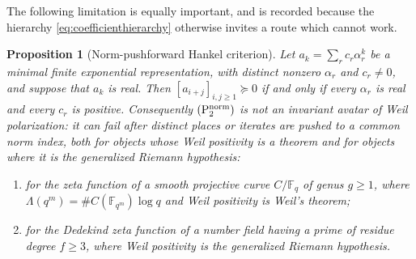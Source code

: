 \documentclass[11pt]{amsart}
\newtheorem{proposition}[theorem]{Proposition}
\theoremstyle{definition}
\theoremstyle{remark}
\begin{document}
The following limitation is equally important, and is recorded because the
hierarchy \eqref{eq:coefficienthierarchy} otherwise invites a route which
cannot work.

\begin{proposition}[Norm-pushforward Hankel criterion]
\label{prop:P2nogo}
Let $a_k=\sum_rc_r\alpha_r^k$ be a minimal finite exponential
representation, with distinct nonzero $\alpha_r$ and $c_r\ne0$, and suppose
that $a_k$ is real.  Then $[a_{i+j}]_{i,j\ge1}\succeq0$ if and only if every
$\alpha_r$ is real and every $c_r$ is positive.  Consequently
$\mathrm{(P_2^{\rm norm})}$ is not an invariant avatar of Weil
polarization: it can fail after distinct places or iterates are pushed to a
common norm index, both for objects whose Weil positivity is a theorem and
for objects where it is the generalized Riemann hypothesis:
\begin{enumerate}
\item for the zeta function of a smooth projective curve $C/\mathbb F_q$ of
genus $g\ge1$, where $\Lambda(q^m)=\#C(\mathbb F_{q^m})\log q$ and Weil
positivity is Weil's theorem;
\item for the Dedekind zeta function of a number field having a prime of
residue degree $f\ge3$, where Weil positivity is the generalized Riemann
hypothesis.
\end{enumerate}
\end{proposition}
\end{document}
